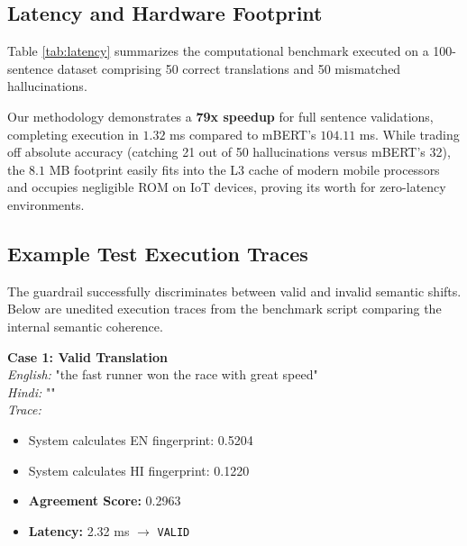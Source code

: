 \documentclass[conference]{IEEEtran}
\begin{document}
\subsection{Latency and Hardware Footprint}
Table \ref{tab:latency} summarizes the computational benchmark executed on a 100-sentence dataset comprising 50 correct translations and 50 mismatched hallucinations.

\begin{table}[H]
\centering
\caption{Comprehensive Inference Benchmark (CPU)}
\label{tab:latency}
\end{table}

Our methodology demonstrates a \textbf{79x speedup} for full sentence validations, completing execution in $1.32$ ms compared to mBERT's $104.11$ ms. While trading off absolute accuracy (catching 21 out of 50 hallucinations versus mBERT's 32), the $8.1$ MB footprint easily fits into the L3 cache of modern mobile processors and occupies negligible ROM on IoT devices, proving its worth for zero-latency environments.

\subsection{Example Test Execution Traces}
The guardrail successfully discriminates between valid and invalid semantic shifts. Below are unedited execution traces from the benchmark script comparing the internal semantic coherence.

\vspace{0.2cm}
\noindent \textbf{Case 1: Valid Translation} \\
\textit{English:} "the fast runner won the race with great speed" \\
\textit{Hindi:} "" \\
\textit{Trace:}
\begin{itemize}
    \item System calculates EN fingerprint: 0.5204
    \item System calculates HI fingerprint: 0.1220
    \item \textbf{Agreement Score:} 0.2963
    \item \textbf{Latency:} 2.32 ms $\rightarrow$ \texttt{VALID}
\end{itemize}
\end{document}
